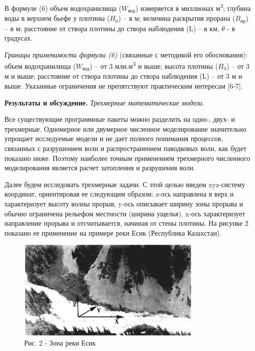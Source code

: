 \begin{multicols}{2}
В формуле (6) объем водохранилища (\(W_{\text{вод}}\)) измеряется в миллионах
м\textsuperscript{3}; глубина воды в верхнем бьефе у плотины (\(H_{0}\))
-- в м; величина раскрытия прорана (\(B_{\text{пр}}\)) -- в м; расстояние от
створа плотины до створа наблюдения (L) -- в км, \(\theta\) - в
градусах.

\emph{Границы применимости формулы (6)} (связанные с методикой его
обоснования): объем водохранилища (\(W_{\text{вод}}\)) -- от 3
млн.м\textsuperscript{3} и выше; высота плотины (\(H_{0}\)) -- от 3 м и
выше; расстояние от створа плотины до створа наблюдения (L) -- от 3 м и
выше. Указанные ограничения не препятствуют практическим интересам
{[}6-7{]}.

{\bfseries Результаты и обсуждение.} \emph{Трехмерные математические
модели.}

Все существующие программные пакеты можно разделить на одно-, двух- и
трехмерные. Одномерное или двумерное численное моделирование значительно
упрощает исследуемые модели и не дает полного понимания процессов,
связанных с разрушением волн и распространением паводковых волн, как
будет показано ниже. Поэтому наиболее точным применением трехмерного
численного моделирования является расчет затопления и разрушения волн.

Далее будем исследовать трехмерные задачи. С этой целью введем
xyz-систему координат, ориентировав ее следующим образом: z-ось
направлена в верх и характеризует высоту волны прорыв, y-ось описывает
ширину зоны прорыва и обычно ограничена рельефом местности (ширина
ущелья), x-ось характеризует направление прорыва и отсчитывается,
начиная от стены плотины. На рисунке 2 показано ее применение на примере
реки Есик (Республика Казахстан).
\end{multicols}

\begin{figure}[H]
	\centering
	\includegraphics[width=0.8\textwidth]{assets/62}
	\caption*{Рис. 2 - Зона реки Есик}
\end{figure}

